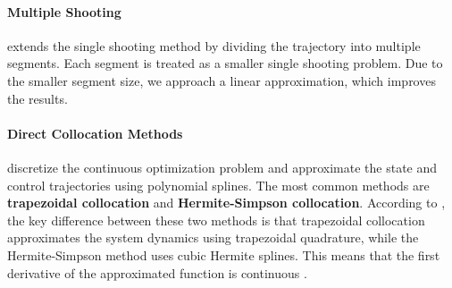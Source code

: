 \paragraph{Multiple Shooting} extends the single shooting method by dividing the trajectory into multiple segments. Each segment is treated as a smaller single shooting problem. Due to the smaller segment size, we approach a linear approximation, which improves the results.

\paragraph{Direct Collocation Methods} discretize the continuous optimization problem and approximate the state and control trajectories using polynomial splines. The most common methods are \textbf{trapezoidal collocation} and \textbf{Hermite-Simpson collocation}. According to \cite{betts2010practical}, the key difference between these two methods is that trapezoidal collocation approximates the system dynamics using trapezoidal quadrature, while the Hermite-Simpson method uses cubic Hermite splines. This means that the first derivative of the approximated function is continuous \cite{kelly2017introduction}.
